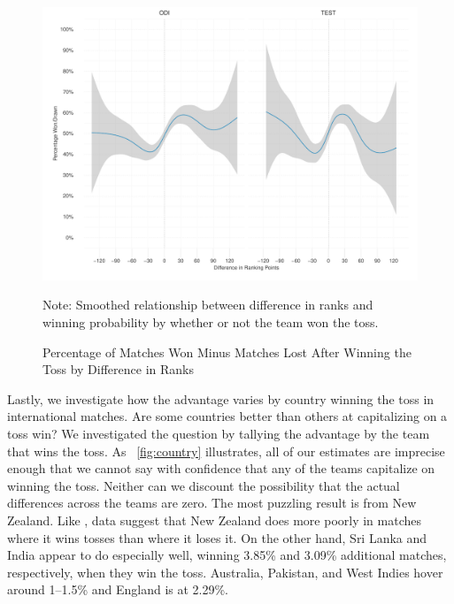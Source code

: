 \documentclass[12pt]{article}
\begin{document}
\begin{figure}[htbp]
\centering
\caption{Percentage of Matches Won Minus Matches Lost After Winning the Toss by Difference in Ranks}
\includegraphics[width=1\textwidth]{../figs/winbyRank.pdf}
{\footnotesize Note: Smoothed relationship between difference in ranks and winning probability by whether or not the team won the toss.\par}
\label{fig:ranks}
\end{figure}

Lastly, we investigate how the advantage varies by country winning the toss in international matches. Are some countries better than others at capitalizing on a toss win? We investigated the question by tallying the advantage by the team that wins the toss. As ~\ref{fig:country} illustrates, all of our estimates are imprecise enough that we cannot say with confidence that any of the teams capitalize on winning the toss. Neither can we discount the possibility that the actual differences across the teams are zero. The most puzzling result is from New Zealand. Like \citet{Saad2015}, data suggest that New Zealand does more poorly in matches where it wins tosses than where it loses it. On the other hand, Sri Lanka and India appear to do especially well, winning 3.85\% and 3.09\% additional matches, respectively, when they win the toss. Australia, Pakistan, and West Indies hover around 1--1.5\% and England is at 2.29\%. 
\end{document}
